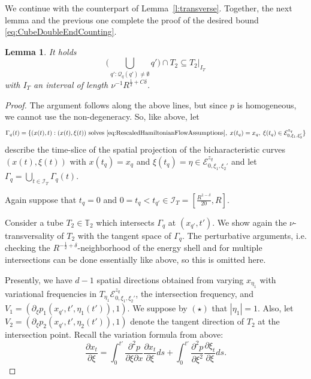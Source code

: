 \documentclass{amsart}
\newtheorem{lemma}[theorem]{Lemma}
\theoremstyle{definition}
\newcommand{\T}{\mathbb{T}}
\begin{document}
We continue with the counterpart of Lemma~\ref{l:transverse}. Together, the next lemma and the previous one complete the proof of the desired bound \eqref{eq:CubeDoubleEndCounting}.
\begin{lemma}
It holds
\begin{equation*}
\big( \bigcup_{q': \mathcal{Q}_{q} (q') \neq \emptyset } q' \big) \cap T_2 \subseteq T_2 \big\vert_{I_T}
\end{equation*}
with $I_T$ an interval of length $\nu^{-1} R^{\frac{1}{2}+C\delta}$.
\end{lemma}
\begin{proof}
The argument follows along the above lines, but since $p$ is homogeneous, we cannot use the non-degeneracy. So, like above, let
\begin{equation*}
\Gamma_{q}(t) = \{(x(t),t) : (x(t),\xi(t)) \text{ solves } \eqref{eq:RescaledHamiltonianFlowAssumptions}, \; x(t_q) = x_q, \; \xi(t_q) \in \mathcal{E}^{z_q}_{0,\xi_1,\xi_2'} \}
\end{equation*}
describe the time-slice of the spatial projection of the bicharacteristic curves \\ $(x(t),\xi(t))$ with $x(t_q) = x_q$ and $\xi(t_q) = \eta \in \mathcal{E}^{z_q}_{0,\xi_1,\xi_2'}$ and let $\Gamma_{q} = \bigcup_{t \in \mathcal{I}_T} \Gamma_{q}(t)$.

Again suppose that $t_q = 0$ and $0=t_q < t_{q'} \in \mathcal{I}_T = [\frac{R^{1-\delta}}{20},R]$.

\smallskip

Consider a tube $T_2 \in \T_2$ which intersects $\Gamma_{q}$ at $(x_{q'},t')$. We show again the $\nu$-transversality of $T_2$ with the tangent space of $\Gamma_{q}$. The perturbative arguments, i.e. checking the $R^{-\frac{1}{2}+\delta}$-neighborhood of the energy shell and for multiple intersections can be done essentially like above, so this is omitted here.

Presently, we have $d-1$ spatial directions obtained from varying $x_{\eta_1}$ with variational frequencies in $T_{\eta_1} \mathcal{E}^{z_q}_{0,\xi_1,\xi_2'}$, the intersection frequency, and \\
 $V_1 = (\partial_{\xi} p_1(x_{q'},t',\eta_1(t')),1)$. We suppose by $(\star)$ that $| \eta_1 | = 1$. Also, let $V_2 = (\partial_{\xi} p_2(x_{q'},t',\eta_2(t')),1)$ denote the tangent direction of $T_2$ at the intersection point. Recall the variation formula from above:
\begin{equation*}
\frac{\partial x_t}{\partial \xi} = \int_{0}^{t'} \frac{\partial^2 p}{\partial \xi \partial x} \frac{\partial x_t}{\partial \xi}  ds + \int_0^{t'} \frac{\partial^2 p}{\partial \xi^2} \frac{\partial \xi_t}{\partial \xi} ds.
\end{equation*}


\end{proof}
\end{document}
